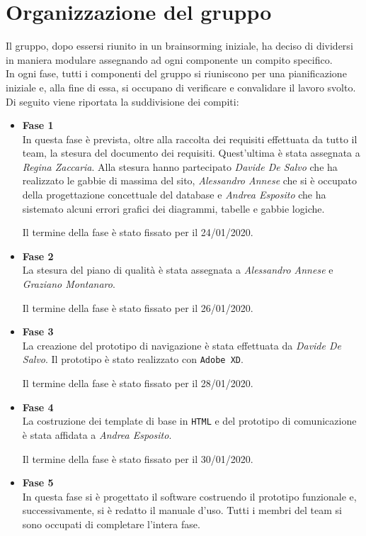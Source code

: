 \section{Organizzazione del gruppo}\label{sec:organizzazione-gruppo}
Il gruppo, dopo essersi riunito in un brainsorming iniziale, ha deciso di 
dividersi in maniera modulare assegnando ad ogni componente un compito 
specifico.\\
In ogni fase, tutti i componenti del gruppo si riuniscono per una 
pianificazione iniziale e, alla fine di essa, si occupano  di verificare e 
convalidare il lavoro svolto.\\
Di seguito viene riportata la suddivisione dei compiti:

\begin{itemize}
	\item \textbf{Fase 1}\\
	In questa fase è prevista, oltre alla raccolta dei requisiti effettuata da 
	tutto il team, la stesura del documento dei requisiti. Quest'ultima è stata 
	assegnata a \textit{Regina Zaccaria}. Alla stesura hanno partecipato 
	\textit{Davide De Salvo} che ha realizzato le gabbie di massima del sito, 
	\textit{Alessandro Annese} che si è occupato della progettazione 
	concettuale del database e \textit{Andrea Esposito} che ha sistemato alcuni 
	errori grafici dei diagrammi, tabelle e gabbie logiche. 
	
	Il termine della fase è stato fissato per il 24/01/2020.
	\item \textbf{Fase 2}\\
	La stesura del piano di qualità è stata assegnata a \textit{Alessandro 
	Annese} e \textit{Graziano Montanaro}.
	
	Il termine della fase è stato fissato per il 26/01/2020.
	\item \textbf{Fase 3}\\
	La creazione del prototipo di navigazione è stata effettuata da 
	\textit{Davide De Salvo}. Il prototipo è stato realizzato con \texttt{Adobe 
	XD}.
	
	Il termine della fase è stato fissato per il 28/01/2020.
	\item \textbf{Fase 4}\\
	La costruzione dei template di base in \texttt{HTML} e del prototipo di 
	comunicazione è stata affidata a \textit{Andrea Esposito}.
	
	Il termine della fase è stato fissato per il 30/01/2020.
	\item \textbf{Fase 5}\\
	In questa fase si è progettato il software costruendo il prototipo 
	funzionale e, successivamente, si è redatto il manuale d'uso. Tutti i 
	membri del team si sono occupati di completare l'intera fase.
	

\end{itemize}
